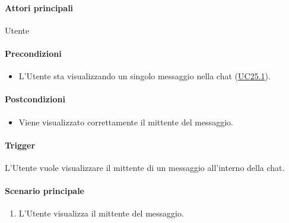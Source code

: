 \paragraph*{Attori principali}
Utente

\paragraph*{Precondizioni}
\begin{itemize}
  \item L'Utente sta visualizzando un singolo messaggio nella chat (\hyperref[UC25point1]{UC25.1}).
\end{itemize}

\paragraph*{Postcondizioni}
\begin{itemize}
  \item Viene visualizzato correttamente il mittente del messaggio.
\end{itemize}

\paragraph*{Trigger}
L'Utente vuole visualizzare il mittente di un messaggio all'interno della chat.

\paragraph*{Scenario principale}
\begin{enumerate}
  \item L'Utente visualizza il mittente del messaggio.
\end{enumerate}

